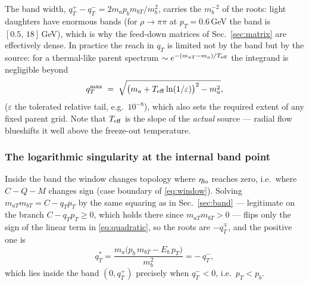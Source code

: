 \documentclass[11pt]{article}
\begin{document}
The band width, $q_T^{+}-q_T^{-}=2m_a p_b m_{bT}/m_b^{2}$, carries the
$m_b^{-2}$ of the roots: light daughters have enormous bands
(for $\rho\to\pi\pi$ at $p_T=0.6$\,GeV the band is
$[0.5,\,18]$\,GeV), which is why the feed-down matrices of
Sec.~\ref{sec:matrix} are effectively dense.  In practice the reach in
$q_T$ is limited not by the band but by the source: for a thermal-like
parent spectrum $\sim e^{-(m_{aT}-m_a)/T_{\rm eff}}$ the integrand is
negligible beyond
\begin{equation}
q_T^{\max}\;=\;\sqrt{\big(m_a+T_{\rm eff}\ln(1/\varepsilon)\big)^{2}-m_a^{2}},
\label{eq:qtmax}
\end{equation}
($\varepsilon$ the tolerated relative tail, e.g.\ $10^{-8}$), which also
sets the required extent of any fixed parent grid.  Note that
$T_{\rm eff}$ is the slope of the \emph{actual} source --- radial flow
blueshifts it well above the freeze-out temperature.

\subsubsection{The logarithmic singularity at the internal band point}
\label{sec:logsing}

Inside the band the window changes topology where $\eta_{\rm lo}$ reaches
zero, i.e.\ where $C-Q-M$ changes sign (case boundary of
\eqref{eq:window}).  Solving $m_{aT}m_{bT}=C-q_Tp_T$ by the same
squaring as in Sec.~\ref{sec:band} --- legitimate on the branch
$C-q_Tp_T\ge0$, which holds there since $m_{aT}m_{bT}>0$ --- flips only
the sign of the linear term in \eqref{eq:quadratic}, so the roots are
$-q_T^{\mp}$, and the positive one is
\begin{equation}
q_T^{*}=\frac{m_a\big(p_b\,m_{bT}-E_b\,p_T\big)}{m_b^{2}}=-\,q_T^- ,
\end{equation}
which lies inside the band $(0,q_T^{+})$ precisely when $q_T^-<0$, i.e.\
$p_T<p_b$.
\end{document}
